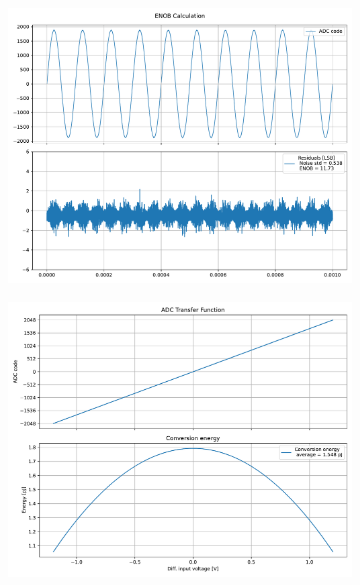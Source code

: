 \documentclass[varwidth]{standalone}
\begin{document}
\begin{figure}
\begin{subfigure}{0.32\textwidth}
    \includegraphics[width=\textwidth]{base_enob.pdf}
\end{subfigure}
\begin{subfigure}{0.32\textwidth}
    \begin{table}
    \let\center\empty
    \let\endcenter\relax
    \centering
    \resizebox{0.3\width}{!}{}
    \end{table}
    \includegraphics[width=\textwidth]{base_energy.pdf}
\end{subfigure}
\end{figure}
\end{document}
